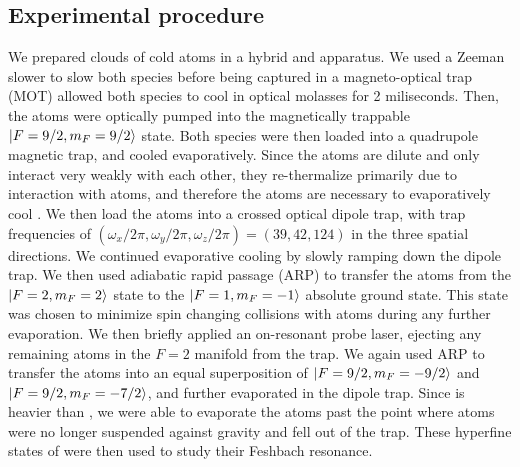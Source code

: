 \documentclass[12pt]{iopart}
\begin{document}
\subsection{Experimental procedure}
We prepared clouds of cold \K{} atoms in a hybrid \K{} and \Rb{} apparatus. We used a Zeeman slower to slow both species before being captured in a magneto-optical trap (MOT) allowed both species to cool in optical molasses for 2 miliseconds. Then, the \K{} atoms were optically pumped into the magnetically trappable $\mathinner{|{F=9/2, m_F=9/2}\rangle}$ state. Both species were then loaded into a quadrupole magnetic trap, and cooled evaporatively. Since the \K{} atoms are dilute and only interact very weakly with each other, they re-thermalize primarily due to interaction with \Rb{} atoms, and therefore the \Rb{} atoms are necessary to evaporatively cool \K{}. We then load the atoms into a crossed optical dipole trap, with trap frequencies of $(\omega_x/2\pi,\omega_y/2\pi,\omega_z/2\pi) =(39, 42, 124)$ in the three spatial directions. We continued evaporative cooling by slowly ramping down the dipole trap. We then used adiabatic rapid passage (ARP) to transfer the \Rb{} atoms from the $\mathinner{|{F=2, m_F=2}\rangle}$ state to the  $\mathinner{|{F=1, m_F=-1}\rangle}$ absolute ground state. This state was chosen to minimize spin changing collisions with \K{} atoms during any further evaporation.  We then briefly applied an on-resonant probe laser, ejecting any remaining \Rb{} atoms in the $F=2$ manifold from the trap. We again used ARP to transfer the \K{} atoms into an equal superposition of $\mathinner{|{F=9/2,m_F=-9/2}\rangle}$ and $\mathinner{|{F=9/2,m_F=-7/2}\rangle}$, and further evaporated in the dipole trap. Since \Rb{} is heavier than \K{}, we were able to evaporate the \K{} atoms past the point where \Rb{} atoms were no longer suspended against gravity and fell out of the trap.  These hyperfine states of \K{} were then used to study their Feshbach resonance. 
\end{document}
